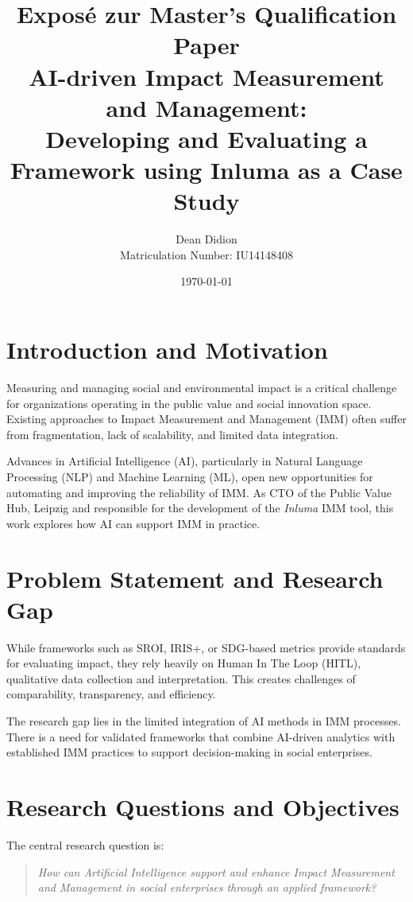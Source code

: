 \documentclass[a4paper,12pt]{article}
\begin{document}
\title{Exposé zur Master's Qualification Paper \\[0.5em]
\Large AI-driven Impact Measurement and Management: \\
Developing and Evaluating a Framework using Inluma as a Case Study}
\author{Dean Didion\\ Matriculation Number: IU14148408


}
\date{\today}
\maketitle

\section{Introduction and Motivation}\label{sec:introduction-and-motivation}
Measuring and managing social and environmental impact is a critical challenge for organizations operating in the public value and social innovation space.
Existing approaches to Impact Measurement and Management (IMM) often suffer from fragmentation, lack of scalability, and limited data integration.

Advances in Artificial Intelligence (AI), particularly in Natural Language Processing (NLP) and Machine Learning (ML), open new opportunities for automating and improving the reliability of IMM. As CTO of the Public Value Hub, Leipzig and responsible for the development of the \textit{Inluma} IMM tool, this work explores how AI can support IMM in practice.

\section{Problem Statement and Research Gap}\label{sec:problem-statement-and-research-gap}
While frameworks such as SROI, IRIS+, or SDG-based metrics provide standards for evaluating impact, they rely heavily on Human In The Loop (HITL), qualitative data collection and interpretation.
This creates challenges of comparability, transparency, and efficiency.

The research gap lies in the limited integration of AI methods in IMM processes.
There is a need for validated frameworks that combine AI-driven analytics with established IMM practices to support decision-making in social enterprises.

\section{Research Questions and Objectives}\label{sec:research-questions-and-objectives}
The central research question is:
\begin{quote}
\textit{How can Artificial Intelligence support and enhance Impact Measurement and Management in social enterprises through an applied framework?}
\end{quote}
\end{document}
